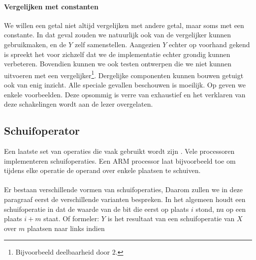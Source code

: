 \paragraph{Vergelijken met constanten}
We willen een getal niet altijd vergelijken met andere getal, maar soms met een constante. In dat geval zouden we natuurlijk ook van de vergelijker kunnen gebruikmaken, en de $Y$ zelf samenstellen. Aangezien $Y$ echter op voorhand gekend is spreekt het voor zichzelf dat we de implementatie echter grondig kunnen verbeteren. Bovendien kunnen we ook testen ontwerpen die we niet kunnen uitvoeren met een vergelijker\footnote{Bijvoorbeeld deelbaarheid door $2$.}. Dergelijke componenten kunnen bouwen getuigt ook van enig inzicht. Alle speciale gevallen beschouwen is moeilijk. Op  geven we enkele voorbeelden. Deze opsommig is verre van exhaustief en het verklaren van deze schakelingen wordt aan de lezer overgelaten.

\subsection{Schuifoperator}
Een laatste set van operaties die vaak gebruikt wordt zijn . Vele processoren implementeren schuifoperaties. Een ARM processor laat bijvoorbeeld toe om tijdens elke operatie de operand over enkele plaatsen te schuiven.

\paragraph{}
Er bestaan verschillende vormen van schuifoperaties, Daarom zullen we in deze paragraaf eerst de verschillende varianten bespreken. In het algemeen houdt een schuifoperatie in dat de waarde van de bit die eerst op plaats $i$ stond, nu op een plaats $i+m$ staat. Of formeler: $Y$ is het resultaat van een schuifoperatie van $X$ over $m$ plaatsen naar links indien

